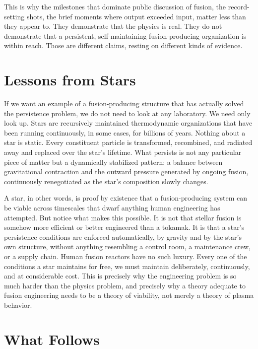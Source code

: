 This is why the milestones that dominate public discussion of fusion, the record-setting shots, the brief moments where output exceeded input, matter less than they appear to. They demonstrate that the physics is real. They do not demonstrate that a persistent, self-maintaining fusion-producing organization is within reach. Those are different claims, resting on different kinds of evidence.

\section{Lessons from Stars}

If we want an example of a fusion-producing structure that has actually solved the persistence problem, we do not need to look at any laboratory. We need only look up. Stars are recursively maintained thermodynamic organizations that have been running continuously, in some cases, for billions of years. Nothing about a star is static. Every constituent particle is transformed, recombined, and radiated away and replaced over the star's lifetime. What persists is not any particular piece of matter but a dynamically stabilized pattern: a balance between gravitational contraction and the outward pressure generated by ongoing fusion, continuously renegotiated as the star's composition slowly changes.

A star, in other words, is proof by existence that a fusion-producing system can be viable across timescales that dwarf anything human engineering has attempted. But notice what makes this possible. It is not that stellar fusion is somehow more efficient or better engineered than a tokamak. It is that a star's persistence conditions are enforced automatically, by gravity and by the star's own structure, without anything resembling a control room, a maintenance crew, or a supply chain. Human fusion reactors have no such luxury. Every one of the conditions a star maintains for free, we must maintain deliberately, continuously, and at considerable cost. This is precisely why the engineering problem is so much harder than the physics problem, and precisely why a theory adequate to fusion engineering needs to be a theory of viability, not merely a theory of plasma behavior.

\section{What Follows}

